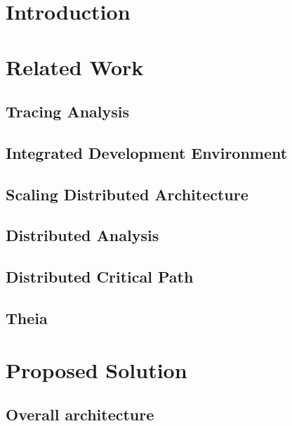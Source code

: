 \label{sec:architecture}

\section{Introduction}

\section{Related Work}

\subsection{Tracing Analysis}

\subsection{Integrated Development Environment}

\subsection{Scaling Distributed Architecture}

\subsection{Distributed Analysis}

\subsection{Distributed Critical Path}

\subsection{Theia}

\section{Proposed Solution}
\subsection{Overall architecture}
\subsection{}

